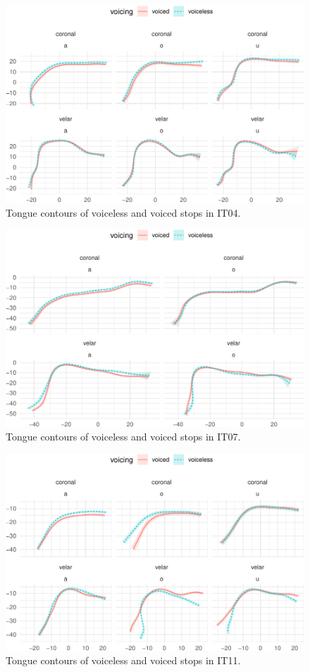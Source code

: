 \documentclass[
  11pt,
]{article}
\begin{document}
\begin{figure}

{\centering \includegraphics[width=.8\textwidth]{2018-polar-gam_files/figure-latex/Figure10} 

}

\caption{Tongue contours of voiceless and voiced stops in IT04.}\label{f:Figure10}
\end{figure}

\begin{figure}

{\centering \includegraphics[width=.8\textwidth]{2018-polar-gam_files/figure-latex/Figure11} 

}

\caption{Tongue contours of voiceless and voiced stops in IT07.}\label{f:Figure11}
\end{figure}

\begin{figure}

{\centering \includegraphics[width=.8\textwidth]{2018-polar-gam_files/figure-latex/Figure12} 

}

\caption{Tongue contours of voiceless and voiced stops in IT11.}\label{f:Figure12}
\end{figure}
\end{document}
